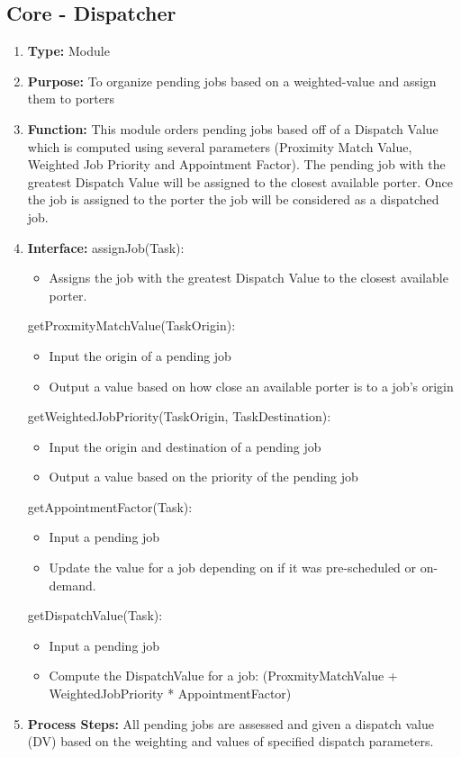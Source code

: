 \documentclass[paper=letter, fontsize=10pt]{scrartcl}
\numberwithin{equation}{section}		%
\numberwithin{figure}{section}			%
\numberwithin{table}{section}				%
\begin{document}
\subsection{Core - Dispatcher}
\begin{enumerate}[]
	\item \textbf{Type:} Module
	\item \textbf{Purpose:} To organize pending jobs based on a weighted-value and assign them to porters 
	\item \textbf{Function:} This module orders pending jobs based off of a Dispatch Value which is computed using several parameters (Proximity Match Value, Weighted Job Priority and Appointment Factor).  The pending job with the greatest Dispatch Value will be assigned to the closest available porter.  Once the job is assigned to the porter the job will be considered as a dispatched job.
	\item \textbf{Interface:} \newline
	 assignJob(Task):
	 	\begin{itemize}
	 		\item Assigns the job with the greatest Dispatch Value to the closest available porter.
	 	\end{itemize}
	 getProxmityMatchValue(TaskOrigin):
	 	\begin{itemize}
	 		\item Input the origin of a pending job
	 		\item Output a value based on how close an available porter is to a job's origin
	 	\end{itemize}
	 getWeightedJobPriority(TaskOrigin, TaskDestination):
	 	\begin{itemize}
	 		\item Input the origin and destination of a pending job
	 		\item Output a value based on the priority of the pending job
	 	\end{itemize}
	 getAppointmentFactor(Task):
	 	\begin{itemize}
	 		\item Input a pending job
	 		\item Update the value for a job depending on if it was pre-scheduled or on-demand.
	 	\end{itemize}
	 getDispatchValue(Task):
	 	\begin{itemize}
	 		\item Input a pending job
	 		\item Compute the DispatchValue for a job: (ProxmityMatchValue + WeightedJobPriority * AppointmentFactor) 
	 	\end{itemize}
	\item \textbf{Process Steps:}
	All pending jobs are assessed and given a dispatch value (DV) based on the weighting and values of specified dispatch parameters.
	

\end{enumerate}
\end{document}
